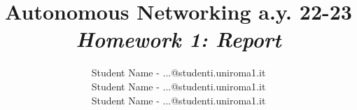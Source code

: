 \documentclass{article}
\title{Autonomous Networking a.y. 22-23\\ \textit{Homework 1: Report}}
\author{
Student Name - ...@studenti.uniroma1.it\\ 
Student Name - ...@studenti.uniroma1.it \\ 
Student Name - ...@studenti.uniroma1.it
}
\begin{document}
\maketitle

\sloppy


%
\end{document}
